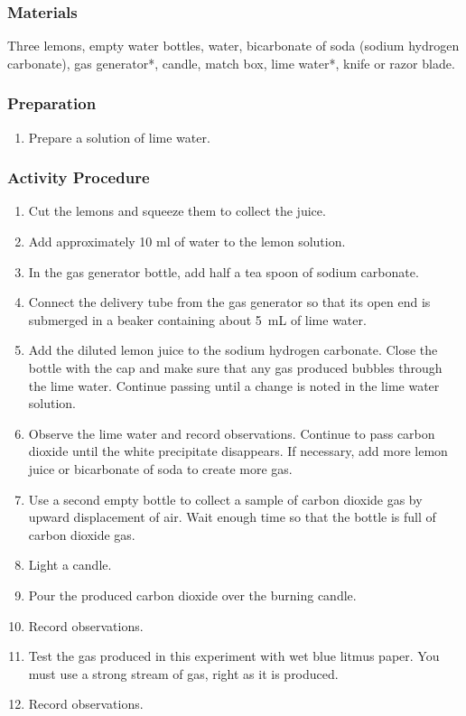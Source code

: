 \subsubsection*{Materials}
Three lemons, empty water bottles, water, bicarbonate of soda (sodium hydrogen carbonate), gas generator*, candle, match box, lime water*, knife or razor blade.

\subsubsection*{Preparation}
\begin{enumerate}
\item{Prepare a solution of lime water.}
\end{enumerate}

\subsubsection*{Activity Procedure}
\begin{enumerate}
\item{Cut the lemons and squeeze them to collect the juice.}
\item{Add approximately 10 ml of water to the lemon solution.}
\item{In the gas generator bottle, add half a tea spoon of sodium carbonate.}
\item{Connect the delivery tube from the gas generator so that its open end is submerged in a beaker containing about 5~mL of lime water.}
\item{Add the diluted lemon juice to the sodium hydrogen carbonate. Close the bottle with the cap and make sure that any gas produced bubbles through the lime water. Continue passing until a change is noted in the lime water solution.}
\item{Observe the lime water and record observations. Continue to pass carbon dioxide until the white precipitate disappears. If necessary, add more lemon juice or bicarbonate of soda to create more gas.}
\item{Use a second empty bottle to collect a sample of carbon dioxide gas by upward displacement of air. Wait enough time so that the bottle is full of carbon dioxide gas.}
\item{Light a candle.}
\item{Pour the produced carbon dioxide over the burning candle.}
\item{Record observations.}
\item{Test the gas produced in this experiment with wet blue litmus paper. You must use a strong stream of gas, right as it is produced.}
\item{Record observations.}
\end{enumerate}

